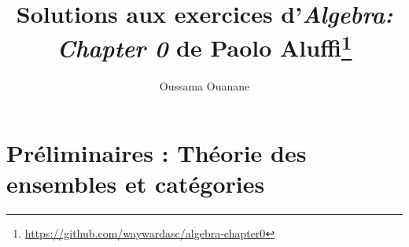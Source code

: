 \documentclass[a4paper]{report}
\title{Solutions aux exercices d'\textit{Algebra: Chapter 0} de Paolo Aluffi\thanks{\href{https://github.com/waywardasc/algebra-chapter0}{https://github.com/waywardasc/algebra-chapter0}}}
\author{Oussama Ouanane}
\begin{document}
\maketitle


\tableofcontents

\chapter{Préliminaires : Théorie des ensembles et catégories}

\end{document}
